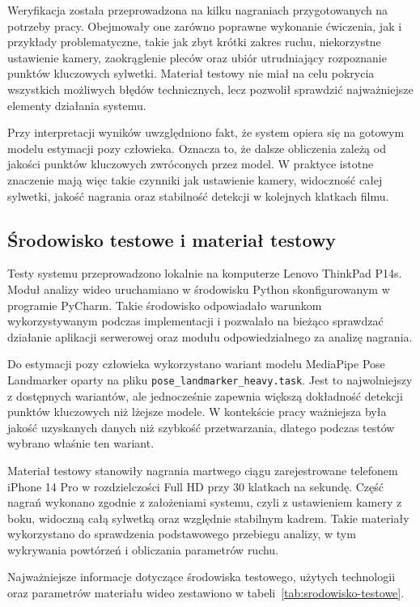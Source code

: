 Weryfikacja została przeprowadzona na kilku nagraniach przygotowanych na potrzeby pracy. Obejmowały one zarówno poprawne wykonanie ćwiczenia, jak i przykłady problematyczne, takie jak zbyt krótki zakres ruchu, niekorzystne ustawienie kamery, zaokrąglenie pleców oraz ubiór utrudniający rozpoznanie punktów kluczowych sylwetki. Materiał testowy nie miał na celu pokrycia wszystkich możliwych błędów technicznych, lecz pozwolił sprawdzić najważniejsze elementy działania systemu.

Przy interpretacji wyników uwzględniono fakt, że system opiera się na gotowym modelu estymacji pozy człowieka. Oznacza to, że dalsze obliczenia zależą od jakości punktów kluczowych zwróconych przez model. W praktyce istotne znaczenie mają więc takie czynniki jak ustawienie kamery, widoczność całej sylwetki, jakość nagrania oraz stabilność detekcji w kolejnych klatkach filmu.

\subsection{Środowisko testowe i materiał testowy}

Testy systemu przeprowadzono lokalnie na komputerze Lenovo ThinkPad P14s. Moduł analizy wideo uruchamiano w środowisku Python skonfigurowanym w programie PyCharm. Takie środowisko odpowiadało warunkom wykorzystywanym podczas implementacji i pozwalało na bieżąco sprawdzać działanie aplikacji serwerowej oraz modułu odpowiedzialnego za analizę nagrania.

Do estymacji pozy człowieka wykorzystano wariant modelu MediaPipe Pose Landmarker oparty na pliku \texttt{pose\_landmarker\_heavy.task}. Jest to najwolniejszy z dostępnych wariantów, ale jednocześnie zapewnia większą dokładność detekcji punktów kluczowych niż lżejsze modele. W kontekście pracy ważniejsza była jakość uzyskanych danych niż szybkość przetwarzania, dlatego podczas testów wybrano właśnie ten wariant.

Materiał testowy stanowiły nagrania martwego ciągu zarejestrowane telefonem iPhone 14 Pro w rozdzielczości Full HD przy 30 klatkach na sekundę. Część nagrań wykonano zgodnie z założeniami systemu, czyli z ustawieniem kamery z boku, widoczną całą sylwetką oraz względnie stabilnym kadrem. Takie materiały wykorzystano do sprawdzenia podstawowego przebiegu analizy, w tym wykrywania powtórzeń i obliczania parametrów ruchu.

Najważniejsze informacje dotyczące środowiska testowego, użytych technologii oraz parametrów materiału wideo zestawiono w tabeli~\ref{tab:srodowisko-testowe}.


